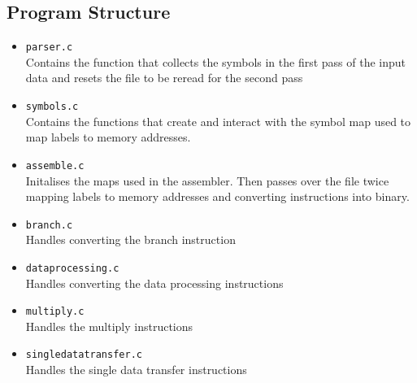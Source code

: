 \documentclass[8pt]{article}
\begin{document}
\begin{minipage}{0.45\textwidth}
\subsection{Program Structure}

\begin{itemize}
    \item \texttt{parser.c} \\Contains the function that collects the symbols in the first pass of the
    input data and resets the file to be reread for the second pass
    \item \texttt{symbols.c} \\Contains the functions that create and interact with the
    symbol map used to map labels to memory addresses.
    \item \texttt{assemble.c} \\Initalises the maps used in the assembler. Then 
    passes over the file twice mapping labels to memory addresses and converting
    instructions into binary.
    \item \texttt{branch.c} \\Handles converting the branch instruction
    \item \texttt{dataprocessing.c} \\Handles converting the data processing
    instructions
    \item \texttt{multiply.c} \\Handles the multiply instructions
    \item \texttt{singledatatransfer.c} \\Handles the single data transfer instructions
\end{itemize}
\end{minipage}%
\hfill
\end{document}
